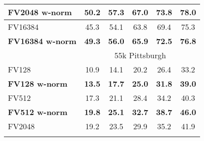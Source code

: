 \begin{tabularx}{0.883\linewidth}{|l|c c c c c|}
	    \textbf{FV2048 w-norm}  & \textbf{50.2} & \textbf{57.3} & \textbf{67.0} & \textbf{73.8} & \textbf{78.0} \\
	    \hline
	    \rowcolor{maroon!10}
		\textcolor{petr}{FV16384}						&\textcolor{petr}{45.3}     
	    												&\textcolor{petr}{54.1}     
	    												&\textcolor{petr}{63.8}     
	    												&\textcolor{petr}{69.4}    
	    												&\textcolor{petr}{75.3}   \\ 
	    \rowcolor{maroon!10}
	    \textcolor{petr}{\textbf{FV16384 w-norm}}		&\textcolor{petr}{\textbf{49.3}}      
	    												&\textcolor{petr}{\textbf{56.0}}      
	    												&\textcolor{petr}{\textbf{65.9}}      
	    												&\textcolor{petr}{\textbf{72.5}}      
	    												&\textcolor{petr}{\textbf{76.8}} 	\\
			\rowcolor{maroon!40}
			\multicolumn{1}{|c}{\quad} & \multicolumn{5}{c|}{55k Pittsburgh} \\
		\hline 
			\rowcolor{maroon!10}
			FV128     & 10.9 & 14.1 & 20.2 & 26.4 & 33.2 \\
			\rowcolor{maroon!10}
			\textbf{FV128 w-norm}  & \textbf{13.5}  &  \textbf{17.7}  &  \textbf{25.0}  &  \textbf{31.8}  &  \textbf{39.0} \\
	    \hline  
	    \rowcolor{maroon!10}
	    FV512   & 17.3 &  21.1 &  28.4 &  34.2 &  40.3 \\      
	    \rowcolor{maroon!10}
	    \rowcolor{maroon!10}
	    \textbf{FV512 w-norm}  & \textbf{19.8} &  \textbf{25.1} &  \textbf{32.7}  & \textbf{38.7} &  \textbf{46.0} \\
	    \hline
		\rowcolor{maroon!10}
		FV2048        & 19.2 & 23.5 & 29.9 &  35.2 &  41.9 \\
		\rowcolor{maroon!10}

\end{tabularx}
